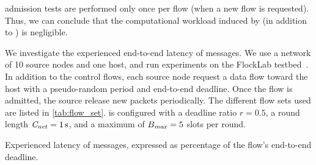 \DRP admission tests are performed only once per flow (when a new flow is requested). Thus, we can conclude that the computational workload induced by \DRP (in addition to \blink) is negligible.



We investigate the experienced end-to-end latency of messages. We use a network of 10 source nodes and one host, and run experiments on the FlockLab testbed~\cite{lim2013FlockLab}. In addition to the control flows, each source node request a data flow toward the host with a pseudo-random period and end-to-end deadline.
Once the flow is admitted, the source \APs release new packets periodically.
The different flow sets used are listed in \cref{tab:flow_set}. \DRP is configured with a deadline ratio $r=0.5$, a round length $\mathit{C_{net}} = 1\,\text{s}$, and a maximum of $B_{\mathit{max}} = 5$ slots per round.


\begin{table}
	\centering
	\caption{Experienced latency of messages, expressed as percentage of the flow's end-to-end deadline.
	}
	{\smaller}
	\label{tab:latency}
\end{table}


